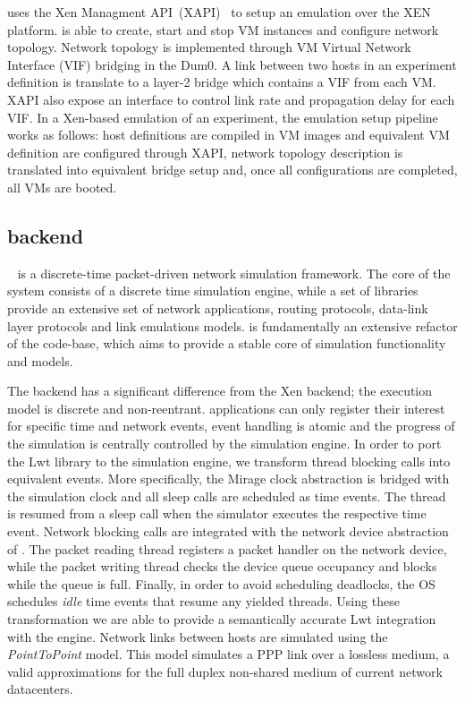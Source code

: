 \sdnsim uses the Xen Managment API~(XAPI)~\cite{xapi} to setup an emulation over
the XEN platform.  \sdnsim is able to create, start and stop VM instances and
configure network topology.  Network topology is implemented through VM Virtual
Network Interface (VIF) bridging in the Dum0. A link between two hosts in an
experiment definition is translate to a layer-2 bridge which contains a VIF from
each VM.  XAPI also expose an interface to control link rate and propagation
delay for each VIF.  In a Xen-based emulation of an \sdnsim experiment, the
emulation setup pipeline works as follows: host definitions are compiled in VM
images and equivalent VM definition are configured through XAPI, network
topology description is translated into equivalent bridge setup and, once all
configurations are completed, all VMs are booted.

\subsection{ backend}

~\cite{Henderson2006} is a discrete-time packet-driven network simulation
framework. The core of the system consists of a discrete time simulation engine,
while a set of  libraries provide an extensive set of network
applications, routing protocols, data-link layer protocols and link emulations
models.  is fundamentally an extensive refactor of the 
code-base, which aims to provide a stable core of simulation functionality and
models. 

The  backend has a significant difference from the Xen backend; the
execution model is discrete and non-reentrant.  applications can only register
their interest for specific time and network events, event handling is atomic
and the progress of the simulation is centrally controlled by the simulation
engine. In order to port the Lwt library to the 
simulation engine, we transform thread blocking calls into equivalent  events.
More specifically, the Mirage clock abstraction is bridged with the 
simulation clock and all sleep calls are scheduled as  time events.
The thread is resumed from a sleep call when the simulator executes the respective
time event.  Network blocking calls are integrated with the network device
abstraction of .  The packet reading thread registers a packet handler on
the network device, while the packet writing thread checks the device queue
occupancy and blocks while the queue is full. Finally, in order to avoid
scheduling deadlocks, the OS schedules {\it idle} time events that resume any
yielded threads. Using these transformation we are able to provide a semantically
accurate Lwt integration with the  engine. 
Network links between hosts are simulated using the {\it PointToPoint}
model. This model simulates a PPP link over a lossless medium, a valid
approximations for the full duplex non-shared medium of current network
datacenters.

